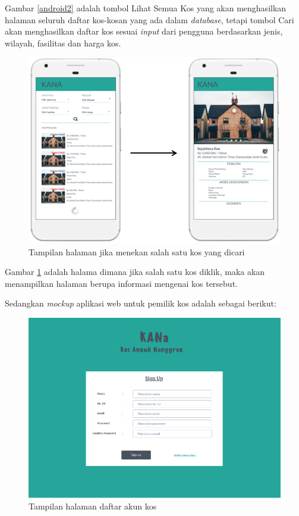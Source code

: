\begin{enumerate}[a.]
Gambar \ref{android2} adalah tombol Lihat Semua Kos yang akan menghasilkan halaman seluruh daftar kos-kosan yang ada dalam \textit{database}, tetapi tombol Cari akan menghasilkan daftar kos sesuai \textit{input} dari pengguna berdasarkan jenis, wilayah, fasilitas dan harga kos.
	
	\begin{figure}[H]
		\centering
		\includegraphics[width=\linewidth]{gambar/and3}
		\caption{Tampilan halaman jika menekan salah satu kos yang dicari}
		\label{android3}
	\end{figure}
	
Gambar \ref{android3} adalah halama dimana jika salah satu kos diklik, maka akan menampilkan halaman berupa informasi mengenai kos tersebut. 

Sedangkan \textit{mockup} aplikasi web untuk pemilik kos adalah sebagai berikut:
	
	\begin{figure}[H]
		\centering
		\includegraphics[scale=0.5]{gambar/web2}
		\caption{Tampilan halaman daftar akun kos}
		\label{webb2}
	\end{figure}
	

\end{enumerate}
